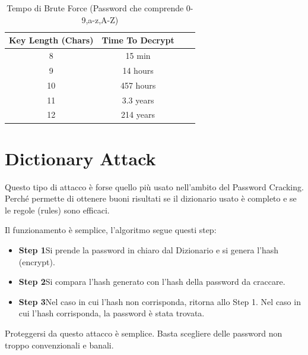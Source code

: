 \begin{table}[h]
    \centering
    \begin{tabular}{ |c|c|c|c| }
        \hline
        \textbf{Key Length (Chars)} & \textbf{Time To Decrypt} \\
        \hline
        8                  & 15 min          \\
        \hline
        9                  & 14 hours        \\
        \hline
        10                 & 457 hours       \\
        \hline
        11                 & 3.3 years       \\
        \hline
        12                 & 214 years       \\
        \hline
    \end{tabular}
    \label{fig:brute}
    \caption{Tempo di Brute Force (Password che comprende 0-9,a-z,A-Z)\cite{hashcrack}}
\end{table}

\newpage

\section{Dictionary Attack}
Questo tipo di attacco \cite{Dictionary_attack} è forse quello più usato nell’ambito del Password Cracking. Perché permette di ottenere buoni risultati se il dizionario usato è completo e se le regole (rules) sono efficaci.

Il funzionamento è semplice, l’algoritmo segue questi step:
\begin{itemize}
    \item \textbf{Step 1}\newline Si prende la password in chiaro dal Dizionario e si genera l’hash (encrypt).
    \item \textbf{Step 2}\newline Si compara l’hash generato con l’hash della password da craccare.
    \item \textbf{Step 3}\newline Nel caso in cui l’hash non corrisponda, ritorna allo Step 1. \newline Nel caso in cui l’hash corrisponda, la password è stata trovata.
\end{itemize}

Proteggersi da questo attacco è semplice. Basta scegliere delle password non troppo convenzionali e banali.

